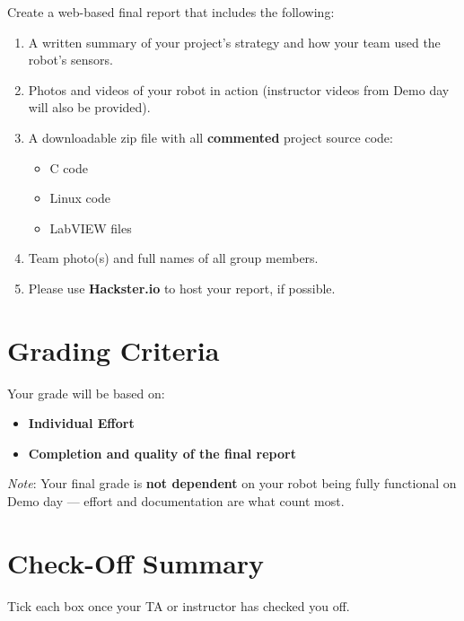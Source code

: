 \documentclass[11pt]{article}
\begin{document}
Create a web-based final report that includes the following:
%
\begin{enumerate}
    \item A written summary of your project’s strategy and how your team used the robot’s sensors.
    \item Photos and videos of your robot in action (instructor videos from Demo day will also be provided).
    \item A downloadable zip file with all \textbf{commented} project source code:
        \begin{itemize}
            \item C code
            \item Linux code
            \item LabVIEW files
        \end{itemize}
    \item Team photo(s) and full names of all group members.
    \item Please use \textbf{Hackster.io} to host your report, if possible.
\end{enumerate}

\section*{Grading Criteria}

Your grade will be based on:
%
\begin{itemize}
    \item \textbf{Individual Effort}
    \item \textbf{Completion and quality of the final report}
\end{itemize}
%
\emph{Note}: Your final grade is \textbf{not dependent} on your robot being fully functional on Demo day — effort and documentation are what count most.

\section*{Check-Off Summary}

Tick each box once your TA or instructor has checked you off.
%
\CheckOffSummary

\MakeFooter
\end{document}
